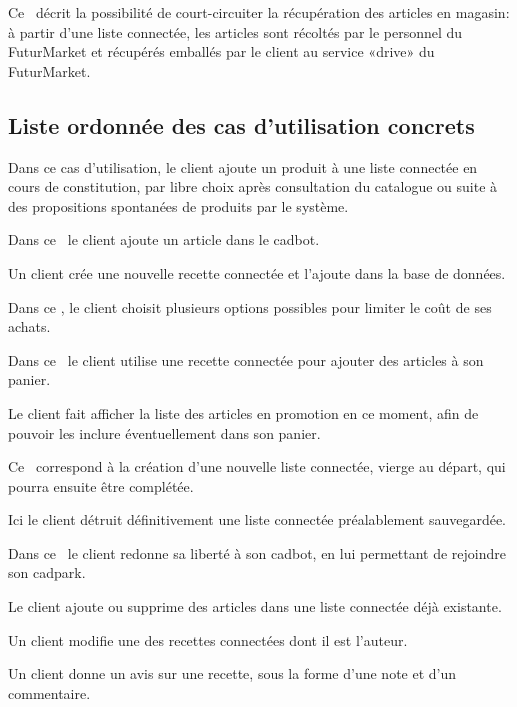 Ce \cu\ décrit la possibilité de court-circuiter la récupération des articles en magasin: à partir d'une liste connectée, les articles sont récoltés par le personnel du FuturMarket et récupérés emballés par le client au service «drive» du FuturMarket.


\subsection{Liste ordonnée des cas d'utilisation concrets}

Dans ce cas d'utilisation, le client ajoute un produit à une liste connectée en cours de constitution, par libre choix après consultation du catalogue ou suite à des propositions spontanées de produits par le système.

Dans ce \cu\ le client ajoute un article dans le cadbot.

Un client crée une nouvelle recette connectée et l'ajoute dans la base de données.

Dans ce \cu, le client choisit plusieurs options possibles pour limiter le coût de ses achats.

Dans ce  \cu\ le client utilise une recette connectée pour ajouter des articles à son panier.

Le client fait afficher la liste des articles en promotion en ce moment, afin de pouvoir les inclure éventuellement dans son panier.

Ce \cu\ correspond à la création d'une nouvelle liste connectée, vierge au départ, qui pourra ensuite être complétée.

Ici le client détruit définitivement une liste connectée préalablement sauvegardée.

\TODO

Dans ce \cu\ le client redonne sa liberté à son cadbot, en lui permettant de rejoindre son cadpark.

Le client ajoute ou supprime des articles dans une liste connectée déjà existante.

Un client modifie une des recettes connectées dont il est l'auteur.

Un client donne un avis sur une recette, sous la forme d'une note et d'un commentaire.

